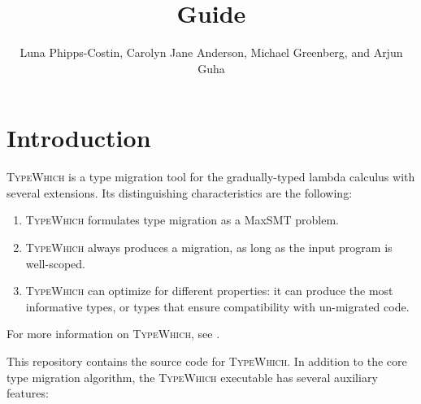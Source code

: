\documentclass{article}
\title{\system Guide}
\author{Luna Phipps-Costin, Carolyn Jane Anderson, Michael Greenberg, and Arjun Guha}
\newcommand{\system}{\textsc{TypeWhich}\xspace}
\begin{document}
\maketitle

\tableofcontents

\section{Introduction}

\system is a type migration tool for the gradually-typed lambda calculus with
several extensions. Its distinguishing characteristics are the following:

\begin{enumerate}

\item \system formulates type migration as a MaxSMT problem.

\item \system always produces a migration, as long as the input program is
   well-scoped.

\item \system can optimize for different properties: it can produce the most
informative types, or types that ensure compatibility with un-migrated code.

\end{enumerate}

For more information on \system, see \citet{typewhich}.

This repository contains the source code for \system. In addition to the
core type migration algorithm, the \system executable has several auxiliary
features:
\end{document}
